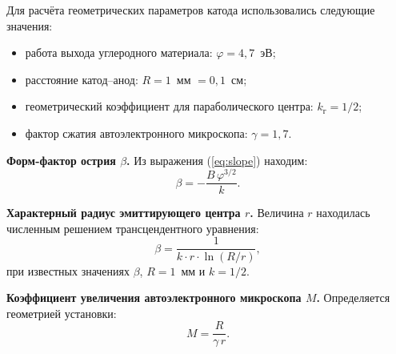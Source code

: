 \documentclass[12pt, a4paper]{article}
\begin{document}
Для расчёта геометрических параметров катода использовались следующие значения:
\begin{itemize}
    \item работа выхода углеродного материала: $\varphi = 4{,}7$~эВ;
    \item расстояние катод--анод: $R = 1$~мм $= 0{,}1$~см;
    \item геометрический коэффициент для параболического центра: $k_{\text{г}} = 1/2$;
    \item фактор сжатия автоэлектронного микроскопа: $\gamma = 1{,}7$.
\end{itemize}

\textbf{Форм-фактор острия $\beta$.} Из выражения (\ref{eq:slope}) находим:
\begin{equation}
    \beta = -\frac{B\,\varphi^{3/2}}{k}.
    \label{eq:beta}
\end{equation}

\textbf{Характерный радиус эмиттирующего центра $r$.} 
Величина $r$ находилась численным решением трансцендентного уравнения:
\begin{equation}
    \beta = \frac{1}{k \cdot r \cdot \ln(R/r)},
    \label{eq:r_transcendental}
\end{equation}
при известных значениях $\beta$, $R = 1$~мм и $k = 1/2$.

\textbf{Коэффициент увеличения автоэлектронного микроскопа $M$.} Определяется геометрией установки:
\begin{equation}
    M = \frac{R}{\gamma\,r}.
    \label{eq:M}
\end{equation}

\end{document}
